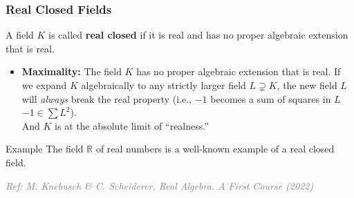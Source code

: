 \documentclass[11pt]{beamer}
\begin{document}
\begin{frame}
    \frametitle{Real Closed Fields}
    
    \begin{definition}
        A field $K$ is called \textbf{real closed} if it is real and has no proper algebraic extension that is real.
        
        \begin{itemize}
            \setlength{\itemsep}{0.2em}
            \item \textbf{Maximality:} The field $K$ has no proper algebraic extension that is real. If we expand $K$ algebraically to any strictly larger field $L \supsetneq K$, the new field $L$ will \emph{always} break the real property (i.e., $-1$ becomes a sum of squares in $L$ $-1 \in \sum L^2$).\\
             And $K$ is at the absolute limit of ``realness.''
        \end{itemize}
    \end{definition}

    \begin{exampleblock}{Example}
        The field $\mathbb{R}$ of real numbers is a well-known example of a real closed field.
    \end{exampleblock}

    \vspace*{\fill}
    \hfill \textcolor{gray}{\tiny \textit{Ref: M. Knebusch \& C. Scheiderer, Real Algebra. A First Course (2022)}}

\end{frame}
\end{document}

